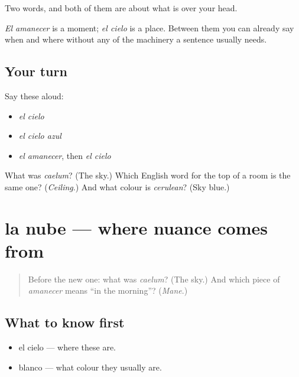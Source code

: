 \begin{grammarlens}[title={What you've built}]
Two words, and both of them are about what is over your head.

\emph{El amanecer} is a moment; \emph{el cielo} is a place. Between them you can already say when and where without any of the machinery a sentence usually needs.
\end{grammarlens}

\subsection*{Your turn}
Say these aloud:

\begin{itemize}
\raggedright
  \item \emph{el cielo}
  \item \emph{el cielo azul}
  \item \emph{el amanecer}, then \emph{el cielo}
\end{itemize}

\begin{tcolorbox}[breakable,colback=teal!4,colframe=teal!35!black,title={Before you move on}]
What was \emph{caelum}? (The sky.) Which English word for the top of a room is the same one? (\emph{Ceiling}.) And what colour is \emph{cerulean}? (Sky blue.)
\end{tcolorbox}
\section[la nube]{la nube — where nuance comes from}

\label{lesson:ES-C289-nube}



\begin{quote}
Before the new one: what was \emph{caelum}? (The sky.) And which piece of \emph{amanecer} means \textquotedblleft{}in the morning\textquotedblright{}? (\emph{Mane}.)
\end{quote}

\subsection*{What to know first}
\begin{itemize}
\raggedright
  \item el cielo — where these are.
  \item blanco — what colour they usually are.
\end{itemize}

